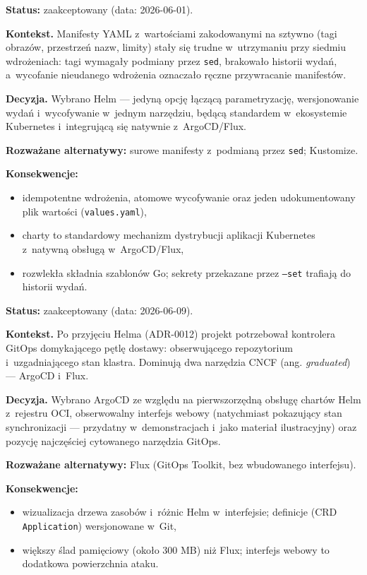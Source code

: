 
\textbf{Status:} zaakceptowany (data: 2026-06-01).

\textbf{Kontekst.} Manifesty YAML z~wartościami zakodowanymi na sztywno (tagi obrazów, przestrzeń nazw, limity) stały się trudne w~utrzymaniu przy siedmiu wdrożeniach: tagi wymagały podmiany przez \texttt{sed}, brakowało historii wydań, a~wycofanie nieudanego wdrożenia oznaczało ręczne przywracanie manifestów.

\textbf{Decyzja.} Wybrano Helm --- jedyną opcję łączącą parametryzację, wersjonowanie wydań i~wycofywanie w~jednym narzędziu, będącą standardem w~ekosystemie Kubernetes i~integrującą się natywnie z~ArgoCD/Flux.

\textbf{Rozważane alternatywy:} surowe manifesty z~podmianą przez \texttt{sed}; Kustomize.

\textbf{Konsekwencje:}
\begin{itemize}
  \item[$+$] idempotentne wdrożenia, atomowe wycofywanie oraz jeden udokumentowany plik wartości (\texttt{values.yaml}),
  \item[$+$] charty to standardowy mechanizm dystrybucji aplikacji Kubernetes z~natywną obsługą w~ArgoCD/Flux,
  \item[$-$] rozwlekła składnia szablonów Go; sekrety przekazane przez \texttt{--set} trafiają do historii wydań.
\end{itemize}


\textbf{Status:} zaakceptowany (data: 2026-06-09).

\textbf{Kontekst.} Po przyjęciu Helma (ADR-0012) projekt potrzebował kontrolera GitOps domykającego pętlę dostawy: obserwującego repozytorium i~uzgadniającego stan klastra. Dominują dwa narzędzia CNCF (ang. \textit{graduated}) --- ArgoCD i~Flux.

\textbf{Decyzja.} Wybrano ArgoCD ze względu na pierwszorzędną obsługę chartów Helm z~rejestru OCI, obserwowalny interfejs webowy (natychmiast pokazujący stan synchronizacji --- przydatny w~demonstracjach i~jako materiał ilustracyjny) oraz pozycję najczęściej cytowanego narzędzia GitOps.

\textbf{Rozważane alternatywy:} Flux (GitOps Toolkit, bez wbudowanego interfejsu).

\textbf{Konsekwencje:}
\begin{itemize}
  \item[$+$] wizualizacja drzewa zasobów i~różnic Helm w~interfejsie; definicje (CRD \texttt{Application}) wersjonowane w~Git,
  \item[$-$] większy ślad pamięciowy (około 300 MB) niż Flux; interfejs webowy to dodatkowa powierzchnia ataku.
\end{itemize}

